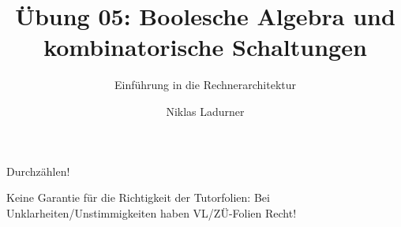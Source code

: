 \documentclass[
  german,            %
  aspectratio=169,    %
]{tumbeamer}
\title{Übung 05: Boolesche Algebra und \\kombinatorische Schaltungen}
\subtitle{Einführung in die Rechnerarchitektur}
\author{Niklas Ladurner}
\institute{\theChairName\\\theDepartmentName\\\theUniversityName}
\date{\DTMdisplaydate{2023}{11}{17}{-1}}
\begin{document}
\maketitle

\begin{frame}[c]{}{}
  \begin{center}
    \LARGE  Durchzählen!
  \end{center}
\end{frame}

\begin{frame}[c]{}{}
  \begin{center}
    \LARGE  Keine Garantie für die Richtigkeit der Tutorfolien: Bei Unklarheiten/Unstimmigkeiten
    haben VL/ZÜ-Folien Recht!
  \end{center}
\end{frame}
\end{document}
